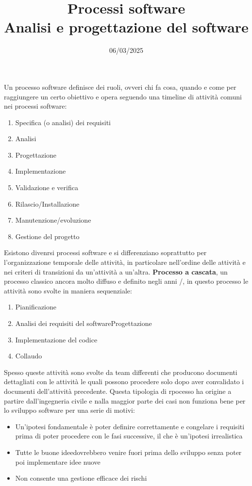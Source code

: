 \documentclass{article}
\title{Processi software\\\normalsize Analisi e progettazione del software}
\date{06/03/2025}
\begin{document}
\maketitle
Un processo software definisce dei ruoli, ovveri chi fa cosa, quando e come per raggiungere un certo obiettivo e opera seguendo una timeline di attività comuni nei processi software:
\begin{enumerate}
    \item Specifica (o analisi) dei requisiti
    \item Analisi
    \item Progettazione
    \item Implementazione
    \item Validazione e verifica
    \item Rilascio/Installazione
    \item Manutenzione/evoluzione
    \item Gestione del progetto
\end{enumerate}
Esistono divenrsi processi software e si differenziano soprattutto per l'organizzazione temporale delle attività, in particolare nell'ordine delle attività e nei criteri di transizioni da un'attività a un'altra.\acapo
\textbf{Processo a cascata}, un processo classico ancora molto diffuso e definito negli anni /, in questo processo le attività sono svolte in maniera sequenziale:
\begin{enumerate}
    \item Pianificazione
    \item Analisi dei requisiti del softwareProgettazione
    \item Implementazione del codice
    \item Collaudo
\end{enumerate}
Spesso queste attività sono svolte da team differenti che producono documenti dettagliati con le attività le quali possono procedere solo dopo aver convalidato i documenti dell'attività precedente. Questa tipologia di rpocesso ha origine a partire dall'ingegneria civile e nalla maggior parte dei casi non funziona bene per lo sviluppo software per una serie di motivi:
\begin{itemize}
  \item Un'ipotesi fondamentale è poter definire correttamente e congelare i requisiti prima di poter procedere con le fasi successive, il che è un'ipotesi irrealistica
  \item Tutte le \vopen buone idee\vclosespace dovrebbero venire fuori prima dello sviluppo senza poter poi implementare idee nuove
  \item Non consente una gestione efficace dei rischi
\end{itemize}
\end{document}
